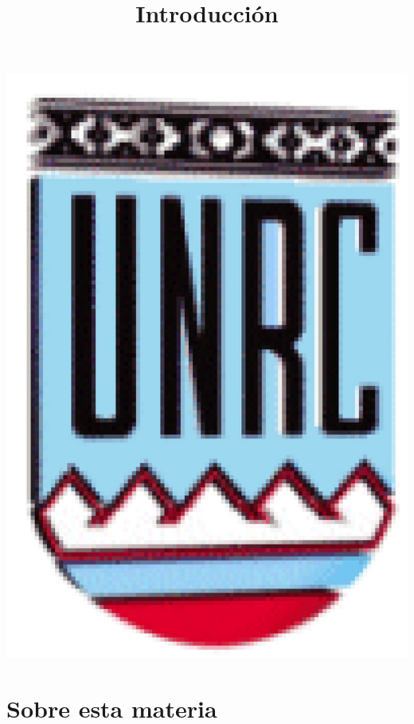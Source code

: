 \documentclass[handout,hyperref={colorlinks=true}]{beamer}
\title[Introducción] %
{%
 Introducción
}
\begin{document}
\begin{frame}
  \maketitle
  \begin{center}
   \includegraphics[scale=0.2]{imagenes/unrc.jpg}
   \end{center}
\end{frame}



\begin{frame}
\tableofcontents
\end{frame}







\section{Sobre esta materia}
\end{document}
